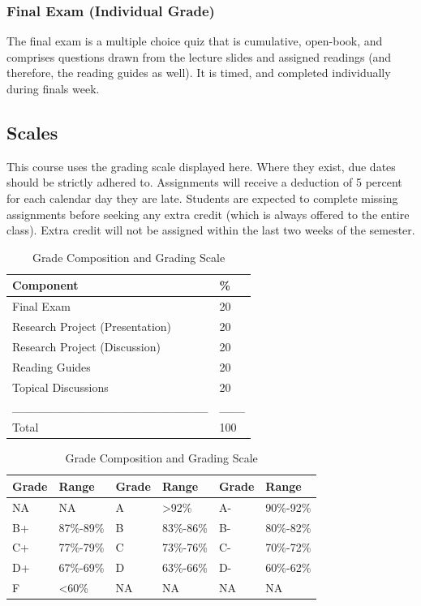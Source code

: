 \documentclass[10pt,]{article}
\begin{document}
\hypertarget{final-exam-individual-grade}{%
\subsubsection{Final Exam (Individual
Grade)}\label{final-exam-individual-grade}}

The final exam is a multiple choice quiz that is cumulative, open-book,
and comprises questions drawn from the lecture slides and assigned
readings (and therefore, the reading guides as well). It is timed, and
completed individually during finals week.

\hypertarget{scales}{%
\subsection{Scales}\label{scales}}

This course uses the grading scale displayed here. Where they exist, due
dates should be strictly adhered to. Assignments will receive a
deduction of 5 percent for each calendar day they are late. Students are
expected to complete missing assignments before seeking any extra credit
(which is always offered to the entire class). Extra credit will not be
assigned within the last two weeks of the semester.

\begin{table}[!h]
\caption{\label{tab:unnamed-chunk-2}Grade Composition and Grading Scale}

\centering
\begin{tabular}[t]{ll}
\toprule
Component & \%\\
\midrule
Final Exam & 20\\
Research Project (Presentation) & 20\\
Research Project (Discussion) & 20\\
Reading Guides & 20\\
Topical Discussions & 20\\
\addlinespace
\_\_\_\_\_\_\_\_\_\_\_\_\_\_\_\_\_\_\_\_\_\_\_ & \_\_\_\\
Total & 100\\
\bottomrule
\end{tabular}
\centering
\begin{tabular}[t]{llllll}
\toprule
Grade & Range & Grade & Range & Grade & Range\\
\midrule
NA & NA & A & >92\% & A- & 90\%-92\%\\
B+ & 87\%-89\% & B & 83\%-86\% & B- & 80\%-82\%\\
C+ & 77\%-79\% & C & 73\%-76\% & C- & 70\%-72\%\\
D+ & 67\%-69\% & D & 63\%-66\% & D- & 60\%-62\%\\
F & <60\% & NA & NA & NA & NA\\
\bottomrule
\end{tabular}
\end{table}
\end{document}
